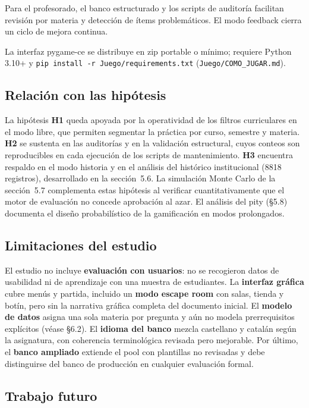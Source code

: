 \documentclass[11pt,a4paper]{article}
\begin{document}
Para el profesorado, el banco estructurado y los scripts de auditoría facilitan revisión por materia y detección de ítems problemáticos. El modo feedback cierra un ciclo de mejora continua.

La interfaz pygame-ce se distribuye en zip portable o mínimo; requiere Python 3.10+ y \texttt{pip install -r Juego/requirements.txt} (\texttt{Juego/COMO\_JUGAR.md}).

\subsection{Relación con las hipótesis}

La hipótesis \textbf{H1} queda apoyada por la operatividad de los filtros curriculares en el modo libre, que permiten segmentar la práctica por curso, semestre y materia. \textbf{H2} se sustenta en las auditorías y en la validación estructural, cuyos conteos son reproducibles en cada ejecución de los scripts de mantenimiento. \textbf{H3} encuentra respaldo en el modo historia y en el análisis del histórico institucional (8818 registros), desarrollado en la sección~5.6. La simulación Monte Carlo de la sección~5.7 complementa estas hipótesis al verificar cuantitativamente que el motor de evaluación no concede aprobación al azar. El análisis del pity (§5.8) documenta el diseño probabilístico de la gamificación en modos prolongados.

\subsection{Limitaciones del estudio}

El estudio no incluye \textbf{evaluación con usuarios}: no se recogieron datos de usabilidad ni de aprendizaje con una muestra de estudiantes. La \textbf{interfaz gráfica} cubre menús y partida, incluido un \textbf{modo escape room} con salas, tienda y botín, pero sin la narrativa gráfica completa del documento inicial. El \textbf{modelo de datos} asigna una sola materia por pregunta y aún no modela prerrequisitos explícitos (véase §6.2). El \textbf{idioma del banco} mezcla castellano y catalán según la asignatura, con coherencia terminológica revisada pero mejorable. Por último, el \textbf{banco ampliado} extiende el pool con plantillas no revisadas y debe distinguirse del banco de producción en cualquier evaluación formal.

\subsection{Trabajo futuro}
\end{document}
